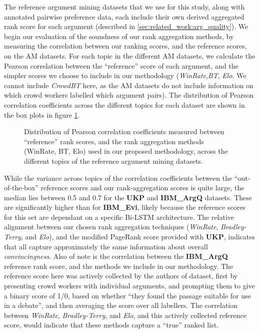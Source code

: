 \documentclass[notitlepage,12pt]{jedm}
\begin{document}
The reference argument mining datasets that we use for this study, along 
with annotated pairwise preference data, each include their own derived 
aggregated rank score for each argument (described in 
\ref{sec:related_work:arg_quality}).
We begin our evaluation of the soundness of our rank aggregation methods, by 
measuring the correlation between our ranking scores, and the reference scores, 
on the AM datasets.
For each topic in the different AM datasets, we calculate the Pearson 
correlation between the ``reference'' score of each argument, and the simpler 
scores we choose to include in our methodology (\textit{WinRate},\textit{BT}, 
\textit{Elo}. We cannot include \textit{CrowdBT} here, as the AM datasets do 
not include information on which crowd workers labelled which argument pairs).
The distribution of Pearson correlation coefficients across the different 
topics for each dataset are shown in the box plots in figure 
\ref{fig:corr_to_reference_score}.

\begin{figure}[H]
	\centering
	\scalebox{0.5}{}
	\caption{Distribution of Pearson correlation coefficients measured between 
		``reference'' rank scores, and the rank aggregation methods (WinRate, 
		BT, Elo) used in our proposed methodology, across the different topics 
		of the reference argument mining datasets.}
	\label{fig:corr_to_reference_score}
\end{figure}

While the variance across topics of the correlation coefficients between the 
``out-of-the-box'' reference scores and our rank-aggregation scores is 
quite large, the median lies between 0.5 and 0.7 for the \textbf{UKP} and 
\textbf{IBM\_ArgQ} datasets.
These are significantly higher than for \textbf{IBM\_Evi}, likely because the 
reference scores for this set are dependant on a specific Bi-LSTM architecture.
The relative alignment between our chosen rank aggregation techniques 
(\textit{WinRate}, \textit{Bradley-Terry}, and \textit{Elo}), and the modified 
PageRank score provided with \textbf{UKP}, indicates that all capture 
approximately the same information about overall \textit{convincingness}.
Also of note is the correlation between the \textbf{IBM\_ArgQ} reference rank 
score, and the methods we include in our methodology. 
The reference score here was actively collected by the authors of dataset, 
first by presenting crowd workers with individual arguments, and prompting them 
to give a binary score of 1/0, based on whether ``they found the passage 
suitable for use in a debate'', and then averaging the score over all labellers.
The correlation between \textit{WinRate}, \textit{Bradley-Terry}, and 
\textit{Elo}, and this actively collected reference score, would indicate that 
these methods capture a ``true'' ranked list.
   
\end{document}
